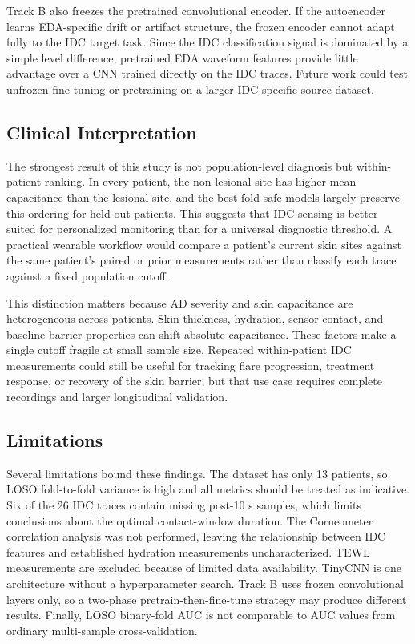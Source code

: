 \documentclass[acmtog]{acmart}
\begin{document}
Track B also freezes the pretrained convolutional encoder. If the autoencoder
learns EDA-specific drift or artifact structure, the frozen encoder cannot adapt
fully to the IDC target task. Since the IDC classification signal is dominated by
a simple level difference, pretrained EDA waveform features provide little
advantage over a CNN trained directly on the IDC traces. Future work could test
unfrozen fine-tuning or pretraining on a larger IDC-specific source dataset.



\subsection{Clinical Interpretation}
The strongest result of this study is not population-level diagnosis but
within-patient ranking. In every patient, the non-lesional site has higher mean
capacitance than the lesional site, and the best fold-safe models largely
preserve this ordering for held-out patients. This suggests that IDC sensing is
better suited for personalized monitoring than for a universal diagnostic
threshold. A practical wearable workflow would compare a patient's current skin
sites against the same patient's paired or prior measurements rather than
classify each trace against a fixed population cutoff.

This distinction matters because AD severity and skin capacitance are
heterogeneous across patients. Skin thickness, hydration, sensor contact, and
baseline barrier properties can shift absolute capacitance. These factors make a
single cutoff fragile at small sample size. Repeated within-patient IDC
measurements could still be useful for tracking flare progression, treatment
response, or recovery of the skin barrier, but that use case requires complete
recordings and larger longitudinal validation.

\subsection{Limitations}
Several limitations bound these findings. The dataset has only 13 patients, so
LOSO fold-to-fold variance is high and all metrics should be treated as
indicative. Six of the 26 IDC traces contain missing post-10 s samples, which
limits conclusions about the optimal contact-window duration. The Corneometer
correlation analysis was not performed, leaving the relationship between IDC
features and established hydration measurements uncharacterized. TEWL
measurements are excluded because of limited data availability. TinyCNN is one
architecture without a hyperparameter search. Track B uses frozen convolutional
layers only, so a two-phase pretrain-then-fine-tune strategy may produce
different results. Finally, LOSO binary-fold AUC is not comparable to AUC values
from ordinary multi-sample cross-validation.
\end{document}
